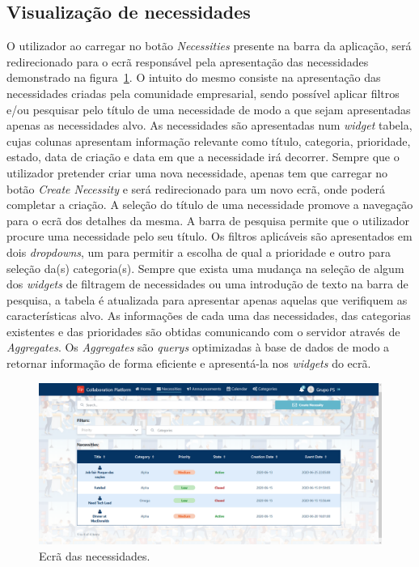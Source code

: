 \subsection{Visualização de necessidades}\label{subsec:implementacao:necessities}
O utilizador ao carregar no botão \textit{Necessities} presente na barra da aplicação, será redirecionado para o ecrã responsável pela apresentação das necessidades demonstrado na figura~\ref{fig:NecessitiesScreen}. 
O intuito do mesmo consiste na apresentação das necessidades criadas pela comunidade empresarial, sendo possível aplicar filtros e/ou pesquisar pelo título de uma necessidade de modo a que sejam apresentadas apenas as necessidades alvo.
As necessidades são apresentadas num \textit{widget} tabela, cujas colunas apresentam informação relevante como título, categoria, prioridade, estado, data de criação e data em que a necessidade irá decorrer. Sempre que o utilizador pretender criar uma nova necessidade, apenas tem que carregar no botão \textit{Create Necessity} e será redirecionado para um novo ecrã, onde poderá completar a criação.
A seleção do título de uma necessidade promove a navegação para o ecrã dos detalhes da mesma.
A barra de pesquisa permite que o utilizador procure uma necessidade pelo seu título.
Os filtros aplicáveis são apresentados em dois \textit{dropdowns}, um para permitir a escolha de qual a prioridade e outro para seleção da(s) categoria(s).
Sempre que exista uma mudança na seleção de algum dos \textit{widgets} de filtragem de necessidades ou uma introdução de texto na barra de pesquisa, a tabela é atualizada para apresentar apenas aquelas que verifiquem as características alvo. 
As informações de cada uma das necessidades, das categorias existentes e das prioridades são obtidas comunicando com o servidor através de \textit{Aggregates}. 
Os \textit{Aggregates} são \textit{querys} optimizadas à base de dados de modo a retornar informação de forma eficiente e apresentá-la nos \textit{widgets} do ecrã.

\begin{figure}[H]
  \centering 
  \includegraphics[scale=0.3]{figures/NecessitiesGeneralScreen.png}
  \caption{Ecrã das necessidades.}\label{fig:NecessitiesScreen}
\end{figure}



